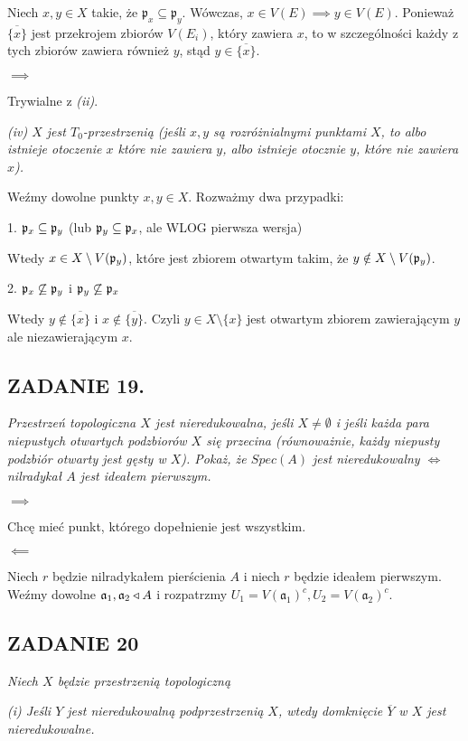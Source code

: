 \documentclass{article}
\begin{document}
Niech $x,y\in X$ takie, że $\mathfrak{p}_x\subseteq\mathfrak{p}_y$. Wówczas, $x\in V(E)\implies y\in V(E)$. Ponieważ $\overline{\{x\}}$ jest przekrojem zbiorów $V(E_i)$, który zawiera $x$, to w szczególności każdy z tych zbiorów zawiera również $y$, stąd $y\in\overline{\{x\}}$.

$\implies$

Trywialne z \emph{(ii)}.
\medskip

\emph{\color{pink}(iv) $X$ jest $T_0$-przestrzenią (jeśli $x,y$ są rozróżnialnymi punktami $X$, to albo istnieje otoczenie $x$ które nie zawiera $y$, albo istnieje otocznie $y$, które nie zawiera $x$).}

Weźmy dowolne punkty $x,y\in X$. Rozważmy dwa przypadki:

1. $\mathfrak{p}_x\subseteq\mathfrak{p}_y$ (lub $\mathfrak{p}_y\subseteq\mathfrak{p}_x$, ale WLOG pierwsza wersja)

Wtedy $x\in X\setminus V(\mathfrak{p}_y)$, które jest zbiorem otwartym takim, że $y\notin X\setminus V(\mathfrak{p}_y)$.

2. $\mathfrak{p}_x\not\subseteq\mathfrak{p}_y$ i $\mathfrak{p}_y\not\subseteq\mathfrak{p}_x$

Wtedy $y\notin\overline{\{x\} }$ i $x\notin\overline{\{y\} }$. Czyli $y\in X\setminus\{x\}$ jest otwartym zbiorem zawierającym $y$ ale niezawierającym $x$.

\subsection*{ZADANIE 19.}
\emph{\color{blue}Przestrzeń topologiczna $X$ jest nieredukowalna, jeśli $X\neq\emptyset$ i jeśli każda para niepustych otwartych podzbiorów $X$ się przecina (równoważnie, każdy niepusty podzbiór otwarty jest gęsty w $X$). Pokaż, że $Spec(A)$ jest nieredukowalny $\iff$ nilradykał $A$ jest ideałem pierwszym.}

$\implies$

Chcę mieć punkt, którego dopełnienie jest wszystkim. 

$\impliedby$

Niech $r$ będzie nilradykałem pierścienia $A$ i niech $r$ będzie ideałem pierwszym. Weźmy dowolne $\mathfrak{a}_1,\mathfrak{a}_2\triangleleft A$ i rozpatrzmy $U_1=V(\mathfrak{a}_1)^c,U_2=V(\mathfrak{a}_2)^c$.

\subsection*{ZADANIE 20}
\emph{\color{pink}Niech $X$ będzie przestrzenią topologiczną}

\emph{\color{pink}(i) Jeśli $Y$ jest nieredukowalną podprzestrzenią $X$, wtedy domknięcie $\overline Y$ w $X$ jest nieredukowalne.}
\end{document}
